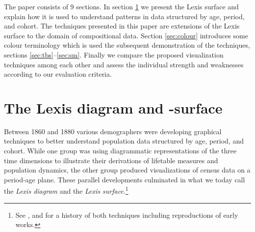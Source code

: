 \documentclass[parskip=half]{scrartcl}
\begin{document}
The paper consists of 9 sections. In section \ref{sec:lexis} we present the Lexis surface and explain how it is used to understand patterns in data structured by age, period, and cohort. The techniques presented in this paper are extensions of the Lexis surface to the domain of compositional data. Section \ref{sec:colour} introduces some colour terminology which is used the subsequent demonstration of the techniques, sections \ref{sec:tbs}--\ref{sec:sm}. Finally we compare the proposed visualization techniques among each other and assess the individual strength and weaknesses according to our evaluation criteria.

\clearpage

\section{The Lexis diagram and -surface} %
\label{sec:lexis}

Between 1860 and 1880 various demographers were developing graphical techniques to better understand population data structured by age, period, and cohort. While one group was using diagrammatic representations of the three time dimensions to illustrate their derivations of lifetable measures and population dynamics, the other group produced visualizations of census data on a period-age plane. These parallel developments culminated in what we today call the \emph{Lexis diagram} and the \emph{Lexis surface}.\footnote{
  See \textcite{Caselli1990}, \textcite{Vandeschrick2001} and \textcite{Keiding2011} for a history of both techniques including reproductions of early works.
}
\end{document}
